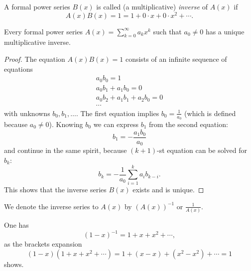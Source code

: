 \begin{page}

\begin{dfn}
A formal power series $B(x)$ is called (a multiplicative) \emph{inverse} of $A(x)$ if
\[
A(x)B(x) = 1 = 1 + 0 \cdot x + 0 \cdot x^2 + \cdots.
\]
\end{dfn}

\end{page}

\begin{page}

\begin{lem}
\label{lem:MultInverse}
Every formal power series $A(x) = \sum_{k=0}^\infty a_k x^k$ such that $a_0 \ne 0$
has a unique multiplicative inverse.
\end{lem}

\end{page}

\begin{page}

\begin{proof}
The equation $A(x)B(x) = 1$ consists of an infinite sequence of equations
\begin{gather*}
a_0b_0 = 1\\
a_0b_1 + a_1b_0 = 0\\
a_0b_2 + a_1b_1 + a_2b_0 = 0\\
\cdots
\end{gather*}
with unknowns $b_0, b_1, \ldots$.
The first equation implies $b_0 = \frac{1}{a_0}$ (which is defined because $a_0 \ne 0$).
Knowing $b_0$ we can express $b_1$ from the second equation:
\[
b_1 = -\frac{a_1b_0}{a_0}
\]
and continue in the same spirit, because $(k+1)$-st equation can be solved for $b_k$:
\[
b_k = -\frac{1}{a_0}\sum_{i=1}^k a_ib_{k-i}.
\]
This shows that the inverse series $B(x)$ exists and is unique.
\end{proof}

We denote the inverse series to $A(x)$ by $(A(x))^{-1}$ or $\frac{1}{A(x)}$.


\end{page}

\begin{page}

\begin{exl}
One has
\[
(1-x)^{-1} = 1 + x + x^2 + \cdots,
\]
as the brackets expansion
\[
(1-x)(1+x+x^2+\cdots) = 1 + (x - x) + (x^2 - x^2) + \cdots = 1
\]
shows.
\end{exl}

\end{page}


